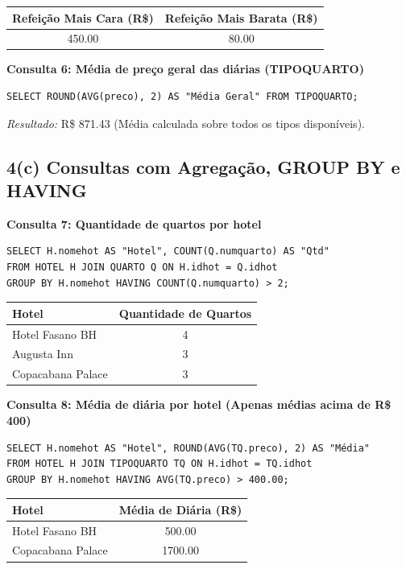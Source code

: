 \documentclass[11pt, a4paper]{article}
\begin{document}
\begin{table}[h]
\centering
\begin{tabular}{cc}
\toprule
\textbf{Refeição Mais Cara (R\$)} & \textbf{Refeição Mais Barata (R\$)} \\
\midrule
450.00 & 80.00 \\
\bottomrule
\end{tabular}
\end{table}

\textbf{Consulta 6: Média de preço geral das diárias (TIPOQUARTO)}
\begin{lstlisting}
SELECT ROUND(AVG(preco), 2) AS "Média Geral" FROM TIPOQUARTO;
\end{lstlisting}
\textit{Resultado:} R\$ 871.43 (Média calculada sobre todos os tipos disponíveis).

\subsection{4(c) Consultas com Agregação, GROUP BY e HAVING}

\textbf{Consulta 7: Quantidade de quartos por hotel}
\begin{lstlisting}
SELECT H.nomehot AS "Hotel", COUNT(Q.numquarto) AS "Qtd"
FROM HOTEL H JOIN QUARTO Q ON H.idhot = Q.idhot
GROUP BY H.nomehot HAVING COUNT(Q.numquarto) > 2;
\end{lstlisting}

\begin{table}[h]
\centering
\begin{tabular}{lc}
\toprule
\textbf{Hotel} & \textbf{Quantidade de Quartos} \\
\midrule
Hotel Fasano BH & 4 \\
Augusta Inn & 3 \\
Copacabana Palace & 3 \\
\bottomrule
\end{tabular}
\end{table}

\textbf{Consulta 8: Média de diária por hotel (Apenas médias acima de R\$ 400)}
\begin{lstlisting}
SELECT H.nomehot AS "Hotel", ROUND(AVG(TQ.preco), 2) AS "Média"
FROM HOTEL H JOIN TIPOQUARTO TQ ON H.idhot = TQ.idhot
GROUP BY H.nomehot HAVING AVG(TQ.preco) > 400.00;
\end{lstlisting}

\begin{table}[h]
\centering
\begin{tabular}{lc}
\toprule
\textbf{Hotel} & \textbf{Média de Diária (R\$)} \\
\midrule
Hotel Fasano BH & 500.00 \\
Copacabana Palace & 1700.00 \\
\bottomrule
\end{tabular}
\end{table}
\end{document}
